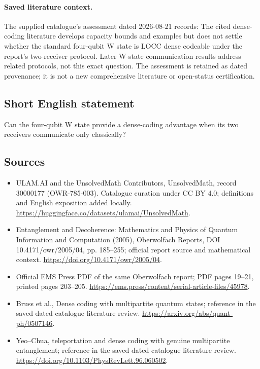 \documentclass[11pt]{article}
\begin{document}
\paragraph{Saved literature context.} The supplied catalogue's assessment dated 2026-08-21 records: The cited dense-coding literature develops capacity bounds and examples but does not settle whether the standard four-qubit W state is LOCC dense codeable under the report's two-receiver protocol. Later W-state communication results address related protocols, not this exact question. The assessment is retained as dated provenance; it is not a new comprehensive literature or open-status certification.
\subsection{Short English statement}
Can the four-qubit W state provide a dense-coding advantage when its two receivers communicate only classically?
\subsection{Sources}
\begin{itemize}
\item[\hypertarget{source:30000177:1}{S1}] ULAM.AI and the UnsolvedMath Contributors, UnsolvedMath, record 30000177 (OWR-785-003). Catalogue curation under CC BY 4.0; definitions and English exposition added locally.
\url{https://huggingface.co/datasets/ulamai/UnsolvedMath}.
\item[\hypertarget{source:30000177:2}{S2}] Entanglement and Decoherence: Mathematics and Physics of Quantum Information and Computation (2005), Oberwolfach Reports, DOI 10.4171/owr/2005/04, pp. 185--255; official report source and mathematical context.
\url{https://doi.org/10.4171/owr/2005/04}.
\item[\hypertarget{source:30000177:3}{S3}] Official EMS Press PDF of the same Oberwolfach report; PDF pages 19--21, printed pages 203--205.
\url{https://ems.press/content/serial-article-files/45978}.
\item[\hypertarget{source:30000177:4}{S4}] Bruss et al., Dense coding with multipartite quantum states; reference in the saved dated catalogue literature review.
\url{https://arxiv.org/abs/quant-ph/0507146}.
\item[\hypertarget{source:30000177:5}{S5}] Yeo--Chua, teleportation and dense coding with genuine multipartite entanglement; reference in the saved dated catalogue literature review.
\url{https://doi.org/10.1103/PhysRevLett.96.060502}.
\end{itemize}
\label{end:30000177}
\end{document}
